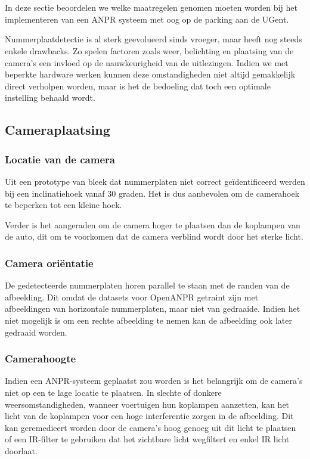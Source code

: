 
\chapter{}
\label{ch:maatregelenanpr}

In deze sectie beoordelen we welke maatregelen genomen moeten worden bij het implementeren van een ANPR systeem met oog op de parking aan de UGent.

Nummerplaatdetectie is al sterk geevolueerd sinds vroeger, maar heeft nog steeds enkele drawbacks. Zo spelen factoren zoals weer, belichting en plaatsing van de camera's een invloed op de nauwkeurigheid van de uitlezingen. Indien we met beperkte hardware werken kunnen deze omstandigheden niet altijd gemakkelijk direct verholpen worden, maar is het de bedoeling dat toch een optimale instelling behaald wordt.

\section{Cameraplaatsing}

\subsection{Locatie van de camera}
Uit een prototype van \textcite{arrieta2019prototype} bleek dat nummerplaten niet correct geïdentificeerd werden bij een inclinatiehoek vanaf 30 graden. Het is dus aanbevolen om de camerahoek te beperken tot een kleine hoek.

Verder is het aangeraden om de camera hoger te plaatsen dan de koplampen van de auto, dit om te voorkomen dat de camera verblind wordt door het sterke licht.

\subsection{Camera oriëntatie}
De gedetecteerde nummerplaten horen parallel te staan met de randen van de afbeelding. Dit omdat de datasets voor OpenANPR getraint zijn met afbeeldingen van horizontale nummerplaten, maar niet van gedraaide. Indien het niet mogelijk is om een rechte afbeelding te nemen kan de afbeelding ook later gedraaid worden.

\subsection{Camerahoogte}
Indien een ANPR-systeem geplaatst zou worden is het belangrijk om de camera's niet op een te lage locatie te plaatsen. In slechte of donkere weersomstandigheden, wanneer voertuigen hun koplampen aanzetten, kan het licht van de koplampen voor een hoge interferentie zorgen in de afbeelding. Dit kan geremedieert worden door de camera's hoog genoeg uit dit licht te plaatsen of een IR-filter te gebruiken dat het zichtbare licht wegfiltert en enkel IR licht doorlaat.

